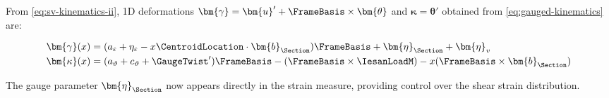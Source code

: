 From \eqref{eq:sv-kinematics-ii}, 1D deformations \(\bm{\gamma}=\bm{u}'+\FrameBasis\times\bm{\theta}\) and \(\bm{\kappa}=\bm{\theta}'\) obtained from \eqref{eq:gauged-kinematics} are:

\begin{equation}
\begin{aligned}
\bm{\gamma}(x) 
&= (a_\varepsilon + \eta_\varepsilon - x\CentroidLocation\cdot\bm{b}_{\Section})\FrameBasis
+ \bm{\eta}_{\Section} + \bm{\eta}_v \\
%
\bm{\kappa}(x) &= (a_\vartheta + c_\vartheta + \GaugeTwist')\FrameBasis - (\FrameBasis \times \IesanLoadM) - x(\FrameBasis \times \bm{b}_{\Section})
\end{aligned}
\label{eq:gauged-deformations}
\end{equation}

The gauge parameter $\bm{\eta}_{\Section}$ now appears directly in the strain measure, providing control over the shear strain distribution. 
